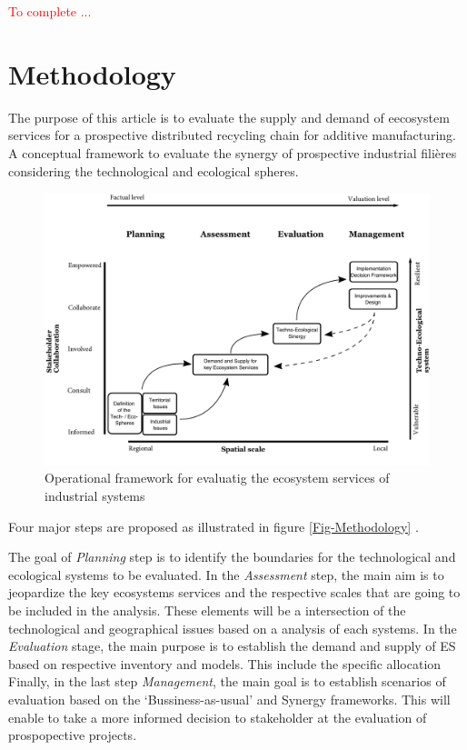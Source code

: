 \documentclass[
]{article}
\begin{document}
\textcolor{red}{ To complete ...}

\hypertarget{methodology}{%
\section{Methodology}\label{methodology}}

The purpose of this article is to evaluate the supply and demand of eecosystem services for a prospective distributed recycling chain for additive manufacturing.
A conceptual framework to evaluate the synergy of prospective industrial filières considering the technological and ecological spheres.

\begin{figure}[!ht]

{\centering \includegraphics[width=1\linewidth]{Figures/Methodology} 

}

\caption{Operational framework for evaluatig the ecosystem services of industrial systems}\label{fig:Fig-Methodology}
\end{figure}

Four major steps are proposed as illustrated in figure \ref{Fig-Methodology} .

The goal of \emph{Planning} step is to identify the boundaries for the technological and ecological systems to be evaluated.
In the \emph{Assessment} step, the main aim is to jeopardize the key ecosystems services and the respective scales that are going to be included in the analysis.
These elements will be a intersection of the technological and geographical issues based on a analysis of each systems.
In the \emph{Evaluation} stage, the main purpose is to establish the demand and supply of ES based on respective inventory and models. This include the specific allocation
Finally, in the last step \emph{Management}, the main goal is to establish scenarios of evaluation based on the `Bussiness-as-usual' and Synergy frameworks.
This will enable to take a more informed decision to stakeholder at the evaluation of prospopective projects.
\end{document}
